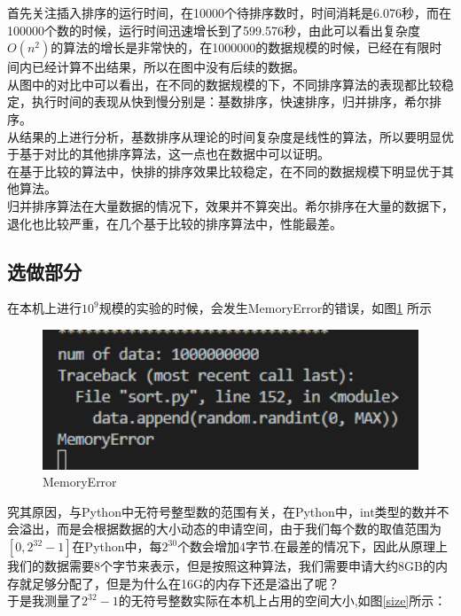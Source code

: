 \documentclass[UTF8]{ctexart}
\begin{document}
首先关注插入排序的运行时间，在10000个待排序数时，时间消耗是6.076秒，而在100000个数的时候，运行时间迅速增长到了599.576秒，由此可以看出复杂度$O(n^2)$的算法的增长是非常快的，在1000000的数据规模的时候，已经在有限时间内已经计算不出结果，所以在图中没有后续的数据。\\

从图中的对比中可以看出，在不同的数据规模的下，不同排序算法的表现都比较稳定，执行时间的表现从快到慢分别是：基数排序，快速排序，归并排序，希尔排序。\\
从结果的上进行分析，基数排序从理论的时间复杂度是线性的算法，所以要明显优于基于对比的其他排序算法，这一点也在数据中可以证明。\\
在基于比较的算法中，快排的排序效果比较稳定，在不同的数据规模下明显优于其他算法。\\
归并排序算法在大量数据的情况下，效果并不算突出。希尔排序在大量的数据下，退化也比较严重，在几个基于比较的排序算法中，性能最差。

\subsection{选做部分}

在本机上进行$10^9$规模的实验的时候，会发生MemoryError的错误，如图\ref{error} 所示\\

\begin{figure}[H]
    \centering
    \includegraphics[width=1\textwidth]{img/error.png}
    \caption{MemoryError}
    \label{error}
\end{figure}

究其原因，与Python中无符号整型数的范围有关，在Python中，int类型的数并不会溢出，而是会根据数据的大小动态的申请空间，由于我们每个数的取值范围为$[0,2^{32}-1]$在Python中，每$2^{30}$个数会增加4字节.在最差的情况下，因此从原理上我们的数据需要8个字节来表示，但是按照这种算法，我们需要申请大约8GB的内存就足够分配了，但是为什么在16G的内存下还是溢出了呢？\\

于是我测量了$2^{32}-1$的无符号整数实际在本机上占用的空间大小,如图\ref{size}所示：
\end{document}
